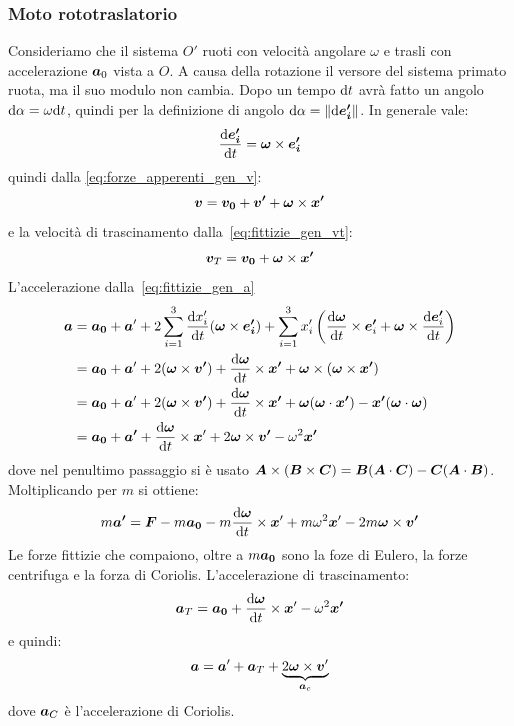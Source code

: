 \subsubsection{Moto rototraslatorio}
Consideriamo che il sistema $O'$ ruoti con velocità angolare $\omega$ e trasli con accelerazione $\boldsymbol{a}_0$ vista a $O$. A causa della rotazione il versore del sistema primato ruota, ma il suo modulo non cambia. Dopo un tempo $\mathrm{d} t$ avrà fatto un angolo $\mathrm{d}\alpha=\omega\mathrm{d} t$, quindi per la definizione di angolo $\mathrm{d}\alpha=\left\lVert\mathrm{d}\boldsymbol{e'_i}\right\rVert$. In generale vale:
\[
  \frac{\mathrm{d}\boldsymbol{e'_i}}{\mathrm{d} t}=\boldsymbol{\omega}\times\boldsymbol{e'_i}
\]
quindi dalla \eqref{eq:forze_apperenti_gen_v}:
\begin{equation}
  \boldsymbol{v}=\boldsymbol{v_0}+\boldsymbol{v'}+\boldsymbol{\omega}\times\boldsymbol{x'}
  \label{eq:forze_apparenti_rot_v}
\end{equation}
e la velocità di trascinamento dalla~\eqref{eq:fittizie_gen_vt}:
\[
  \boldsymbol{v}_T = \boldsymbol{v_0}+\boldsymbol{\omega}\times\boldsymbol{x'}
\]
L'accelerazione dalla~\eqref{eq:fittizie_gen_a}
\[
  \begin{split}
    \boldsymbol{a} &= \boldsymbol{a_0} + \boldsymbol{a}'
    +2\sum_{i=1}^3 \frac{\mathrm{d} x'_i}{\mathrm{d} t}(\boldsymbol{\omega}\times\boldsymbol{e'_i})+ \sum_{i=1}^3 x'_i\left(\frac{\mathrm{d}\boldsymbol{\omega}}{\mathrm{d} t}\times \boldsymbol{e'}_i + \boldsymbol{\omega}\times\frac{\mathrm{d}\boldsymbol{e'}_i}{\mathrm{d} t}\right) \\
    &= \boldsymbol{a_0} + \boldsymbol{a}'
    +2(\boldsymbol{\omega}\times\boldsymbol{v'})+ \frac{\mathrm{d}\boldsymbol{\omega}}{\mathrm{d} t}\times \boldsymbol{x'} + \boldsymbol{\omega}\times(\boldsymbol{\omega}\times \boldsymbol{x'}) \\
    &= \boldsymbol{a_0} + \boldsymbol{a}'
    +2(\boldsymbol{\omega}\times\boldsymbol{v'})+ \frac{\mathrm{d}\boldsymbol{\omega}}{\mathrm{d} t}\times \boldsymbol{x'} + \boldsymbol{\omega}(\boldsymbol{\omega}\cdot\boldsymbol{x'})-\boldsymbol{x'}(\boldsymbol{\omega}\cdot\boldsymbol{\omega}) \\
    & =\boldsymbol{a_0}+\boldsymbol{a'}+\frac{\mathrm{d}\boldsymbol{\omega}}{\mathrm{d} t}\times\boldsymbol{x}'+2\boldsymbol{\omega}\times\boldsymbol{v'}-\omega^2\boldsymbol{x'}
  \end{split}
\]
dove nel penultimo passaggio si è usato $\boldsymbol{A}\times(\boldsymbol{B}\times \boldsymbol{C})=\boldsymbol{B}(\boldsymbol{A}\cdot\boldsymbol{C})-\boldsymbol{C}(\boldsymbol{A}\cdot\boldsymbol{B})$. Moltiplicando per $m$ si ottiene:
\begin{equation}
  \label{eq:newton_non_inerziale}
  m\boldsymbol{a'}=\boldsymbol{F}-m\boldsymbol{a_0}-m\frac{\mathrm{d}\boldsymbol{\omega}}{\mathrm{d} t}\times\boldsymbol{x}'+m\omega^2\boldsymbol{x}'-2m\boldsymbol{\omega}\times\boldsymbol{v'}
\end{equation}
Le forze fittizie che compaiono, oltre a $m\boldsymbol{a_0}$ sono la foze di Eulero, la forze centrifuga e la forza di Coriolis.
L'accelerazione di trascinamento:
\[
  \boldsymbol{a}_T = \boldsymbol{a_0}+\frac{\mathrm{d}\boldsymbol{\omega}}{\mathrm{d} t}\times\boldsymbol{x}'-\omega^2\boldsymbol{x'}
\]
e quindi:
\[
  \boldsymbol{a} = \boldsymbol{a}'+\boldsymbol{a}_T + \underbrace{2\boldsymbol{\omega}\times\boldsymbol{v}'}_{\boldsymbol{a}_c}
\]
dove $\boldsymbol{a}_C$ è l'accelerazione di Coriolis.
